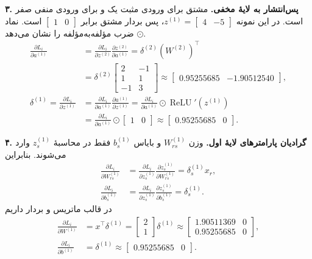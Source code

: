 \documentclass{article}
\numberwithin{equation}{section}
\numberwithin{table}{section}
\DeclareMathOperator{\ReLU}{ReLU}
\begin{document}
\noindent\textbf{۳. پس‌انتشار به لایهٔ مخفی.}
مشتق  برای ورودی مثبت یک و برای ورودی منفی صفر است. در این نمونه \(z^{(1)}=\begin{bmatrix}4&-5\end{bmatrix}\)، پس بردار مشتق برابر \(\begin{bmatrix}1&0\end{bmatrix}\) است. نماد \(\odot\) ضرب مؤلفه‌به‌مؤلفه را نشان می‌دهد.
\begin{align*}
    \frac{\partial L_i}{\partial a^{(1)}}
    &=\frac{\partial L_i}{\partial z^{(2)}}
      \frac{\partial z^{(2)}}{\partial a^{(1)}}
      =\delta^{(2)}(W^{(2)})^\top\\
    &=\delta^{(2)}\begin{bmatrix}2&-1\\1&1\\-1&3\end{bmatrix}
      \approx\begin{bmatrix}0.95255685&-1.90512540\end{bmatrix},\\
    \delta^{(1)}=\frac{\partial L_i}{\partial z^{(1)}}
    &=\frac{\partial L_i}{\partial a^{(1)}}
      \frac{\partial a^{(1)}}{\partial z^{(1)}}
      =\frac{\partial L_i}{\partial a^{(1)}}\odot\ReLU'(z^{(1)})\\
    &=\frac{\partial L_i}{\partial a^{(1)}}\odot\begin{bmatrix}1&0\end{bmatrix}
      \approx\begin{bmatrix}0.95255685&0\end{bmatrix}.
\end{align*}

\noindent\textbf{۴. گرادیان پارامترهای لایهٔ اول.}
وزن \(W_{rs}^{(1)}\) و بایاس \(b_s^{(1)}\) فقط در محاسبهٔ \(z_s^{(1)}\) وارد می‌شوند. بنابراین
\begin{align*}
    \frac{\partial L_i}{\partial W_{rs}^{(1)}}
    &=\frac{\partial L_i}{\partial z_s^{(1)}}
      \frac{\partial z_s^{(1)}}{\partial W_{rs}^{(1)}}
      =\delta_s^{(1)}x_r,\\
    \frac{\partial L_i}{\partial b_s^{(1)}}
    &=\frac{\partial L_i}{\partial z_s^{(1)}}
      \frac{\partial z_s^{(1)}}{\partial b_s^{(1)}}
      =\delta_s^{(1)}.
\end{align*}
در قالب ماتریس و بردار داریم
\begin{align*}
    \frac{\partial L_i}{\partial W^{(1)}}
    &=x^\top\delta^{(1)}
     =\begin{bmatrix}2\\1\end{bmatrix}\delta^{(1)}
     \approx\begin{bmatrix}1.90511369&0\\0.95255685&0\end{bmatrix},\\
    \frac{\partial L_i}{\partial b^{(1)}}&=\delta^{(1)}
     \approx\begin{bmatrix}0.95255685&0\end{bmatrix}.
\end{align*}
\end{document}
